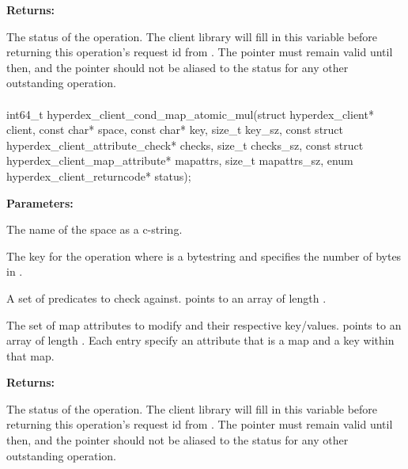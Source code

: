 \noindent\textbf{Returns:}
\begin{description}[labelindent=\widthof{{\code{status}}},leftmargin=*,noitemsep,nolistsep,align=right]
\item[\code{status}] The status of the operation.  The client library will fill in this variable before returning this operation's request id from .  The pointer must remain valid until then, and the pointer should not be aliased to the status for any other outstanding operation.
\end{description}

\paragraph{}
\label{api:c:cond_map_atomic_mul}
\begin{ccode}
int64_t hyperdex_client_cond_map_atomic_mul(struct hyperdex_client* client,
                const char* space,
                const char* key, size_t key_sz,
                const struct hyperdex_client_attribute_check* checks, size_t checks_sz,
                const struct hyperdex_client_map_attribute* mapattrs, size_t mapattrs_sz,
                enum hyperdex_client_returncode* status);
\end{ccode}
\funcdesc 

\noindent\textbf{Parameters:}
\begin{description}[labelindent=\widthof{{\code{mapattrs}, \code{mapattrs\_sz}}},leftmargin=*,noitemsep,nolistsep,align=right]
\item[\code{space}] The name of the space as a c-string.
\item[\code{key}, \code{key\_sz}] The key for the operation where  is a bytestring and  specifies the number of bytes in .
\item[\code{checks}, \code{checks\_sz}] A set of predicates to check against.   points to an array of length .
\item[\code{mapattrs}, \code{mapattrs\_sz}] The set of map attributes to modify and their respective key/values.   points to an array of length .  Each entry specify an attribute that is a map and a key within that map.
\end{description}

\noindent\textbf{Returns:}
\begin{description}[labelindent=\widthof{{\code{status}}},leftmargin=*,noitemsep,nolistsep,align=right]
\item[\code{status}] The status of the operation.  The client library will fill in this variable before returning this operation's request id from .  The pointer must remain valid until then, and the pointer should not be aliased to the status for any other outstanding operation.
\end{description}


